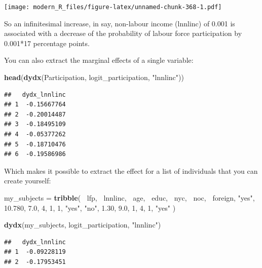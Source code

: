 \documentclass[]{gitbook}
\newenvironment{Shaded}{\begin{snugshade}}{\end{snugshade}}
\newcommand{\DecValTok}[1]{\textcolor[rgb]{0.00,0.00,0.81}{#1}}
\newcommand{\FloatTok}[1]{\textcolor[rgb]{0.00,0.00,0.81}{#1}}
\newcommand{\KeywordTok}[1]{\textcolor[rgb]{0.13,0.29,0.53}{\textbf{#1}}}
\newcommand{\NormalTok}[1]{#1}
\newcommand{\OperatorTok}[1]{\textcolor[rgb]{0.81,0.36,0.00}{\textbf{#1}}}
\newcommand{\StringTok}[1]{\textcolor[rgb]{0.31,0.60,0.02}{#1}}
\theoremstyle{definition}
\theoremstyle{definition}
\theoremstyle{definition}
\theoremstyle{remark}
\begin{document}
\texttt{[image: modern\_R\_files/figure-latex/unnamed-chunk-368-1.pdf]}

So an infinitesimal increase, in say, non-labour income (lnnlinc) of
0.001 is associated with a decrease of the probability of labour force
participation by 0.001*17 percentage points.

You can also extract the marginal effects of a single variable:

\begin{Shaded}
\begin{Highlighting}[]
\KeywordTok{head}\NormalTok{(}\KeywordTok{dydx}\NormalTok{(Participation, logit_participation, }\StringTok{"lnnlinc"}\NormalTok{))}
\end{Highlighting}
\end{Shaded}

\begin{verbatim}
##   dydx_lnnlinc
## 1  -0.15667764
## 2  -0.20014487
## 3  -0.18495109
## 4  -0.05377262
## 5  -0.18710476
## 6  -0.19586986
\end{verbatim}

Which makes it possible to extract the effect for a list of individuals
that you can create yourself:

\begin{Shaded}
\begin{Highlighting}[]
\NormalTok{my_subjects =}\StringTok{ }\KeywordTok{tribble}\NormalTok{(}
    \OperatorTok{~}\NormalTok{lfp,  }\OperatorTok{~}\NormalTok{lnnlinc, }\OperatorTok{~}\NormalTok{age, }\OperatorTok{~}\NormalTok{educ, }\OperatorTok{~}\NormalTok{nyc, }\OperatorTok{~}\NormalTok{noc, }\OperatorTok{~}\NormalTok{foreign,}
    \StringTok{"yes"}\NormalTok{,   }\FloatTok{10.780}\NormalTok{,  }\FloatTok{7.0}\NormalTok{,     }\DecValTok{4}\NormalTok{,    }\DecValTok{1}\NormalTok{,   }\DecValTok{1}\NormalTok{,     }\StringTok{"yes"}\NormalTok{,}
     \StringTok{"no"}\NormalTok{,     }\FloatTok{1.30}\NormalTok{,  }\FloatTok{9.0}\NormalTok{,     }\DecValTok{1}\NormalTok{,    }\DecValTok{4}\NormalTok{,   }\DecValTok{1}\NormalTok{,     }\StringTok{"yes"}
\NormalTok{)}

\KeywordTok{dydx}\NormalTok{(my_subjects, logit_participation, }\StringTok{"lnnlinc"}\NormalTok{)}
\end{Highlighting}
\end{Shaded}

\begin{verbatim}
##   dydx_lnnlinc
## 1  -0.09228119
## 2  -0.17953451
\end{verbatim}
\end{document}
